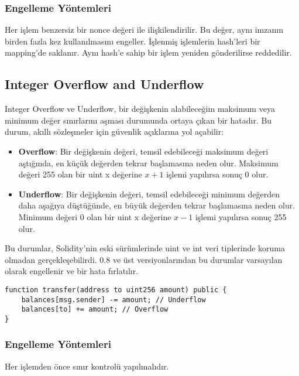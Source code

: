 \subsubsection{Engelleme Yöntemleri}

Her işlem benzersiz bir nonce değeri ile ilişkilendirilir. Bu değer, aynı imzanın birden fazla kez kullanılmasını engeller. İşlenmiş işlemlerin hash'leri bir mapping'de saklanır. Aynı hash'e sahip bir işlem yeniden gönderilirse reddedilir.

\newpage

\subsection{Integer Overflow and Underflow}

Integer Overflow ve Underflow, bir değişkenin alabileceğim maksimum veya minimum değer sınırlarını aşması durumunda ortaya çıkan bir hatadır. Bu durum, akıllı sözleşmeler için güvenlik açıklarına yol açabilir:

\begin{itemize}
    \item \textbf{Overflow}: Bir değişkenin değeri, temsil edebileceği maksimum değeri aştığında, en küçük değerden tekrar başlamasına neden olur. Maksimum değeri 255 olan bir uint x değerine $x + 1$ işlemi yapılırsa sonuç 0 olur.
    \item \textbf{Underflow}: Bir değişkenin değeri, temsil edebileceği minimum değerden daha aşağıya düştüğünde, en büyük değerden tekrar başlamasına neden olur. Minimum değeri 0 olan bir uint x değerine $x - 1$ işlemi yapılırsa sonuç 255 olur.
\end{itemize}

Bu durumlar, Solidity'nin eski sürümlerinde uint ve int veri tiplerinde koruma olmadan gerçekleşebilirdi. 0.8 ve üst versiyonlarından bu durumlar varsayılan olarak engellenir ve bir hata fırlatılır.

\begin{lstlisting}
function transfer(address to uint256 amount) public {
    balances[msg.sender] -= amount; // Underflow
    balances[to] += amount; // Overflow
}
\end{lstlisting}

\subsubsection{Engelleme Yöntemleri}

Her işlemden önce sınır kontrolü yapılmalıdır.

